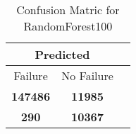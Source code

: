 \begin{table}[] 
\caption{Confusion Matric for RandomForest100} 
\label{Table: Prediction Accuracy-NoneRandomForest100RandomForest100EKF-ignoreReflection100.9EKF-top2-Reflection} 
\centering 
\begin{tabular} 
 {@{}ccc@{}} 
\toprule 
\multicolumn{2}{c}{\textbf{Predicted}}
 \\ \midrule 
\multicolumn{1}{|c|}{Failure} & 
\multicolumn{1}{c|}{No Failure}
 \\ \midrule 
\multicolumn{1}{|c|}{\color{green}\textbf{147486}} & 
\multicolumn{1}{c|}{\color{green}\textbf{11985}}
 \\ \midrule 
\multicolumn{1}{|c|}{\color{red}\textbf{290}} & 
\multicolumn{1}{c|}{\color{red}\textbf{10367}}
 \\ \bottomrule 
\end{tabular} 
\end{table} 
